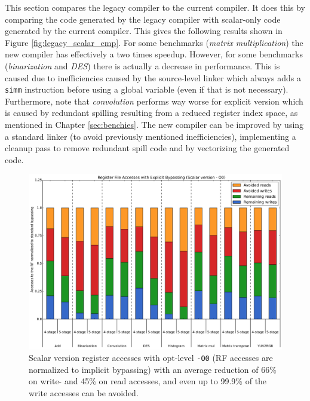 This section compares the legacy compiler to the current compiler. It does this by comparing the code generated by the legacy compiler with scalar-only code generated by the current compiler. This gives the following results shown in Figure \ref{fig:legacy_scalar_cmp}. For some benchmarks (\emph{matrix multiplication}) the new compiler has effectively a two times speedup. However, for some benchmarks (\emph{binarization} and \emph{DES}) there is actually a decrease in performance. This is caused due to inefficiencies caused by the source-level linker which always adds a \texttt{simm} instruction before using a global variable (even if that is not necessary). Furthermore, note that \emph{convolution} performs way worse for explicit version which is caused by redundant spilling resulting from a reduced register index space, as mentioned in Chapter \ref{sec:benchies}. The new compiler can be improved by using a standard linker (to avoid previously mentioned inefficiencies), implementing a cleanup pass to remove redundant spill code and by vectorizing the generated code. 

\begin{figure}[t!]
\centering
\hspace*{-.12in}
\includegraphics[width=.875\textwidth]{figures/stats/scalar_accesses_O0}
\caption{Scalar version register accesses with opt-level \texttt{-O0} (RF accesses are normalized to implicit bypassing) with an average reduction of 66\% on write- and 45\% on read accesses, and even up to 99.9\% of the write accesses can be avoided.}
\label{fig:scalar_improvements_O0}
\end{figure}

